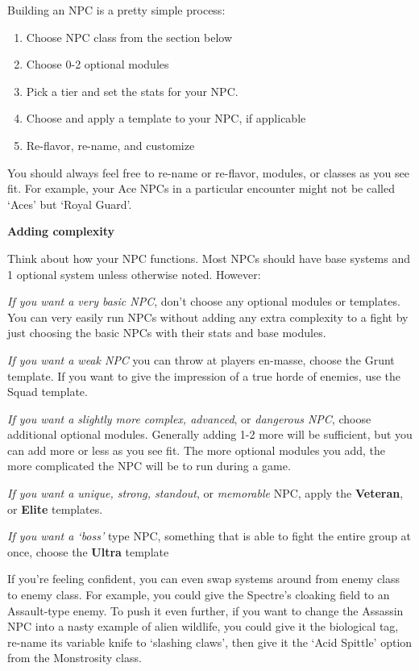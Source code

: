 Building an NPC is a pretty simple process:

\begin{enumerate}
    \item Choose NPC class from the section below
    \item Choose 0-2 optional modules
    \item Pick a tier and set the stats for your NPC.
    \item Choose and apply a template to your NPC, if applicable
    \item Re-flavor, re-name, and customize
\end{enumerate}

You should always feel free to re-name or re-flavor, modules, or classes as you see fit. For
example, your Ace NPCs in a particular encounter might not be called ‘Aces’ but ‘Royal Guard’.

\begin{center}
    \textbf{Adding complexity}
\end{center}

Think about how your NPC functions. Most NPCs should have base systems and 1 optional
system unless otherwise noted. However:

\textit{If you want a very basic NPC}, don’t choose any optional modules or templates. You can very
easily run NPCs without adding any extra complexity to a fight by just choosing the basic NPCs
with their stats and base modules.

\textit{If you want a weak NPC} you can throw at players en-masse, choose the Grunt template. If you
want to give the impression of a true horde of enemies, use the Squad template.

\textit{If you want a slightly more complex, advanced}, or \textit{dangerous NPC}, choose additional optional
modules. Generally adding 1-2 more will be sufficient, but you can add more or less as you see
fit. The more optional modules you add, the more complicated the NPC will be to run during a
game.

\textit{If you want a unique, strong, standout}, or \textit{memorable} NPC, apply the \textbf{Veteran}, or \textbf{Elite} templates.

\textit{If you want a ‘boss’} type NPC, something that is able to fight the entire group at once, choose
the \textbf{Ultra} template

If you’re feeling confident, you can even swap systems around from enemy class to enemy class.
For example, you could give the Spectre’s cloaking field to an Assault-type enemy. To push it
even further, if you want to change the Assassin NPC into a nasty example of alien wildlife, you
could give it the biological tag, re-name its variable knife to ‘slashing claws’, then give it the ‘Acid
Spittle’ option from the Monstrosity class.
            
